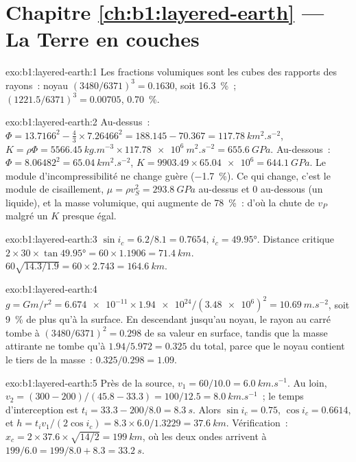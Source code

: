 \section*{Chapitre \ref{ch:b1:layered-earth} --- La Terre en couches}

\begin{solution}{exo:b1:layered-earth:1}
Les fractions volumiques sont les cubes des rapports des rayons~: noyau
$(3480/6371)^3 = 0.1630$, soit \qty{16.3}{\percent}~; 
$(1221.5/6371)^3 = 0.00705$, \qty{0.70}{\percent}.
\end{solution}

\begin{solution}{exo:b1:layered-earth:2}
Au-dessus~: $\Phi = 13.7166^2 - \tfrac43\times7.26466^2 = 188.145 - 70.367 =
\qty{117.78}{km^2.s^{-2}}$, $K = \rho\Phi = \qty{5566.45}{kg.m^{-3}}\times
\qty{117.78e6}{m^2.s^{-2}} = \qty{655.6}{GPa}$. Au-dessous~: $\Phi = 8.06482^2 =
\qty{65.04}{km^2.s^{-2}}$, $K = 9903.49\times\num{65.04e6} = \qty{644.1}{GPa}$.
Le module d'incompressibilité ne change guère (\qty{-1.7}{\percent}). Ce qui
change, c'est le module de cisaillement, $\mu = \rho v_S^2 = \qty{293.8}{GPa}$
au-dessus et $0$ au-dessous (un liquide), et la masse volumique, qui augmente de
\qty{78}{\percent}~: d'où la chute de $v_P$ malgré un $K$ presque égal.
\end{solution}

\begin{solution}{exo:b1:layered-earth:3}
$\sin i_c = 6.2/8.1 = 0.7654$, $i_c = \ang{49.95}$. Distance critique
$2\times30\times\tan\ang{49.95} = 60\times1.1906 = \qty{71.4}{km}$.  $60\sqrt{14.3/1.9} = 60\times2.743 = \qty{164.6}{km}$.
\end{solution}

\begin{solution}{exo:b1:layered-earth:4}
$g = Gm/r^2 = \num{6.674e-11}\times\num{1.94e24}/(\num{3.48e6})^2 =
\qty{10.69}{m.s^{-2}}$, soit \qty{9}{\percent} de plus qu'à la surface. En
descendant jusqu'au noyau, le rayon au carré tombe à $(3480/6371)^2 = 0.298$ de
sa valeur en surface, tandis que la masse attirante ne tombe qu'à
$1.94/5.972 = 0.325$ du total, parce que le noyau contient le tiers de la
masse~: $0.325/0.298 = 1.09$.
\end{solution}

\begin{solution}{exo:b1:layered-earth:5}
Près de la source, $v_1 = 60/10.0 = \qty{6.0}{km.s^{-1}}$. Au loin,
$v_2 = (300 - 200)/(45.8 - 33.3) = 100/12.5 = \qty{8.0}{km.s^{-1}}$~; le temps
d'interception est $t_i = 33.3 - 200/8.0 = \qty{8.3}{s}$. Alors $\sin i_c =
0.75$, $\cos i_c = 0.6614$, et $h = t_i v_1/(2\cos i_c) = 8.3\times6.0/1.3229
= \qty{37.6}{km}$. Vérification~: $x_c = 2\times37.6\times\sqrt{14/2} = \qty{199}{km}$,
où les deux ondes arrivent à $199/6.0 = 199/8.0 + 8.3 = \qty{33.2}{s}$.
\end{solution}

